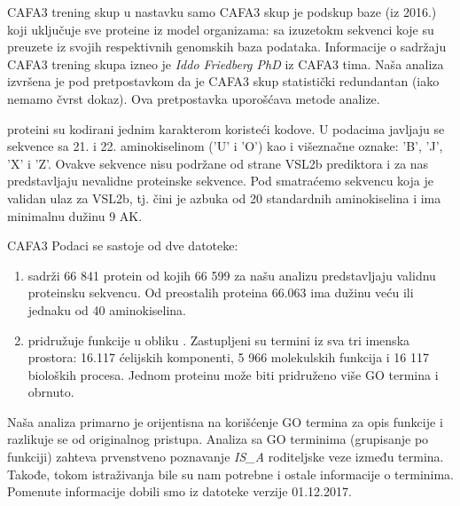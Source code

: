 CAFA3 trening skup u nastavku samo CAFA3 skup je podskup \swissprot baze (iz 2016.) koji
uključuje sve proteine iz model organizama:  sa izuzetokm sekvenci  koje su preuzete iz svojih respektivnih genomskih baza podataka.
Informacije o sadržaju CAFA3 trening skupa izneo je \textit{Iddo Friedberg PhD} iz CAFA3 tima.
Naša analiza izvršena je pod pretpostavkom da je CAFA3 skup statistički redundantan
(iako nemamo čvrst dokaz). Ova pretpostavka uporošćava metode analize.

\swissprot proteini su kodirani jednim karakterom koristeći 
kodove.  U podacima javljaju se sekvence sa  21. i 22. aminokiselinom ('U' i 'O')
kao i  višeznačne oznake: 'B', 'J', 'X' i 'Z'.  Ovakve sekvence nisu podržane od
strane VSL2b prediktora i za nas predstavljaju nevalidne proteinske sekvence. Pod
 smatraćemo sekvencu koja je validan
ulaz za VSL2b, tj. čini je azbuka od 20 standardnih aminokiselina i
ima minimalnu dužinu 9 AK.

CAFA3 Podaci se sastoje od dve datoteke:
\begin{enumerate}
  \item {}  sadrži 66 841 protein od kojih 66 599
    za našu analizu predstavljaju validnu proteinsku sekvencu. Od preostalih
    proteina 66.063 ima dužinu veću ili jednaku od 40 aminokiselina.
  \item {} pridružuje funkcije u obliku 
    . Zastupljeni su termini iz sva tri imenska prostora:
    16.117 ćelijskih komponenti, 5 966 molekulskih funkcija i 16 117 bioloških
    procesa. Jednom proteinu može biti pridruženo više GO termina i obrnuto.
\end{enumerate}

Naša analiza primarno je orijentisna na korišćenje GO termina za opis funkcije
i razlikuje se od originalnog pristupa.  Analiza sa GO terminima (grupisanje po
funkciji) zahteva prvenstveno poznavanje \textit{IS\_A} roditeljske veze između
termina. Takođe, tokom istraživanja bile su nam potrebne i ostale informacije o
terminima. Pomenute informacije dobili smo iz datoteke \cite{go_obo}
verzije 01.12.2017.


